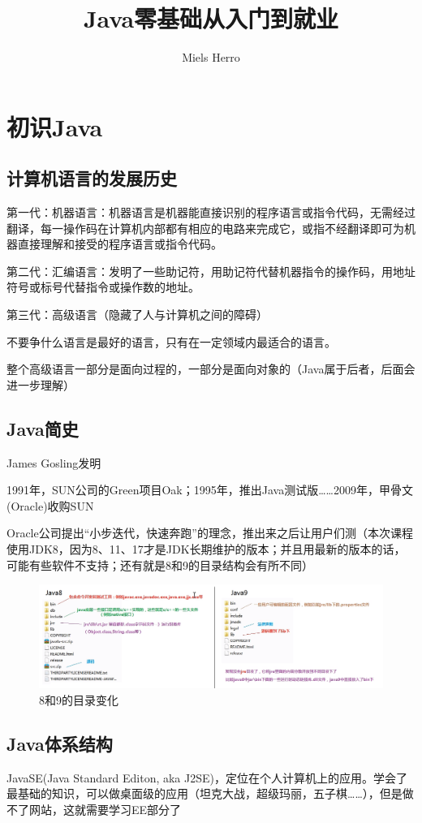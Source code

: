 \documentclass{article}
\title{Java零基础从入门到就业}
\author{Miels Herro}
\date{}
\begin{document}
\maketitle

\section{初识Java}	
	\subsection{计算机语言的发展历史}
	第一代：机器语言：机器语言是机器能直接识别的程序语言或指令代码，无需经过翻译，每一操作码在计算机内部都有相应的电路来完成它，或指不经翻译即可为机器直接理解和接受的程序语言或指令代码。
	
	第二代：汇编语言：发明了一些助记符，用助记符代替机器指令的操作码，用地址符号或标号代替指令或操作数的地址。
	
	第三代：高级语言（隐藏了人与计算机之间的障碍）
	
	不要争什么语言是最好的语言，只有在一定领域内最适合的语言。
	
	整个高级语言一部分是面向过程的，一部分是面向对象的（Java属于后者，后面会进一步理解）
	
	\subsection{Java简史}
	James Gosling发明
	
	1991年，SUN公司的Green项目Oak；1995年，推出Java测试版……2009年，甲骨文(Oracle)收购SUN
	
	Oracle公司提出“小步迭代，快速奔跑”的理念，推出来之后让用户们测（本次课程使用JDK8，因为8、11、17才是JDK长期维护的版本；并且用最新的版本的话，可能有些软件不支持；还有就是8和9的目录结构会有所不同）
	
	\begin{figure}[ht]
		\centering
		\includegraphics[width=120mm]{1.png}
		\caption{8和9的目录变化}
		\label{fig:label}
	\end{figure}

	\subsection{Java体系结构}
	JavaSE(Java Standard Editon, aka J2SE)，定位在个人计算机上的应用。学会了最基础的知识，可以做桌面级的应用（坦克大战，超级玛丽，五子棋……），但是做不了网站，这就需要学习EE部分了
	
\end{document}
